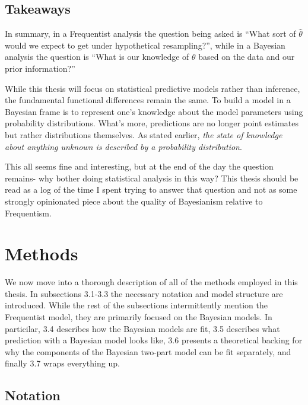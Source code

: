 \documentclass[12pt,twoside]{reedthesis}
\begin{document}
\hypertarget{takeaways}{%
\section{Takeaways}\label{takeaways}}

In summary, in a Frequentist analysis the question being asked is ``What sort of \(\hat{\theta}\) would we expect to get under hypothetical resampling?'', while in a Bayesian analysis the question is ``What is our knowledge of \(\theta\) based on the data and our prior information?''

While this thesis will focus on statistical predictive models rather than inference, the fundamental functional differences remain the same. To build a model in a Bayesian frame is to represent one's knowledge about the model parameters using probability distributions. What's more, predictions are no longer point estimates but rather distributions themselves. As stated earlier, \emph{the state of knowledge about anything unknown is described by a probability distribution}.

This all seems fine and interesting, but at the end of the day the question remains- why bother doing statistical analysis in this way? This thesis should be read as a log of the time I spent trying to answer that question and not as some strongly opinionated piece about the quality of Bayesianism relative to Frequentism.

\hypertarget{methods-sec}{%
\chapter{Methods}\label{methods-sec}}

We now move into a thorough description of all of the methods employed in this thesis. In subsections 3.1-3.3 the necessary notation and model structure are introduced. While the rest of the subsections intermittently mention the Frequentist model, they are primarily focused on the Bayesian models. In particilar, 3.4 describes how the Bayesian models are fit, 3.5 describes what prediction with a Bayesian model looks like, 3.6 presents a theoretical backing for why the components of the Bayesian two-part model can be fit separately, and finally 3.7 wraps everything up.

\hypertarget{notation}{%
\section{Notation}\label{notation}}
\end{document}
